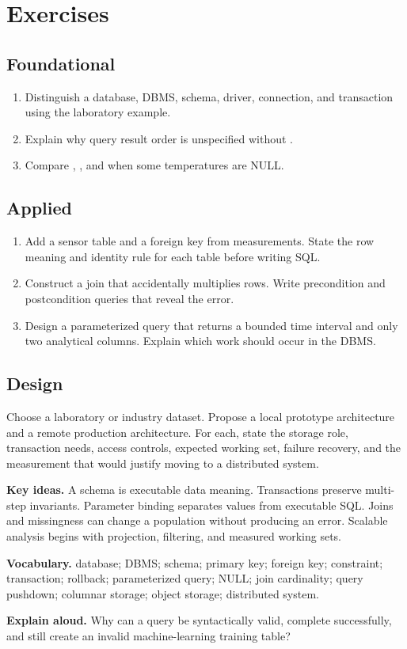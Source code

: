 \section{Exercises}

\subsection*{Foundational}
\begin{enumerate}
  \item Distinguish a database, DBMS, schema, driver, connection, and
  transaction using the laboratory example.
  \item Explain why query result order is unspecified without
  .
  \item Compare , , and
   when some temperatures are NULL.
\end{enumerate}

\subsection*{Applied}
\begin{enumerate}
  \item Add a sensor table and a foreign key from measurements. State the row
  meaning and identity rule for each table before writing SQL.
  \item Construct a join that accidentally multiplies rows. Write precondition
  and postcondition queries that reveal the error.
  \item Design a parameterized query that returns a bounded time interval and
  only two analytical columns. Explain which work should occur in the DBMS.
\end{enumerate}

\subsection*{Design}
Choose a laboratory or industry dataset. Propose a local prototype architecture
and a remote production architecture. For each, state the storage role,
transaction needs, access controls, expected working set, failure recovery, and
the measurement that would justify moving to a distributed system.

\begin{chapterreview}
\textbf{Key ideas.} A schema is executable data meaning. Transactions preserve
multi-step invariants. Parameter binding separates values from executable SQL.
Joins and missingness can change a population without producing an error.
Scalable analysis begins with projection, filtering, and measured working sets.

\textbf{Vocabulary.} database; DBMS; schema; primary key; foreign key;
constraint; transaction; rollback; parameterized query; NULL; join cardinality;
query pushdown; columnar storage; object storage; distributed system.

\textbf{Explain aloud.} Why can a query be syntactically valid, complete
successfully, and still create an invalid machine-learning training table?
\end{chapterreview}

